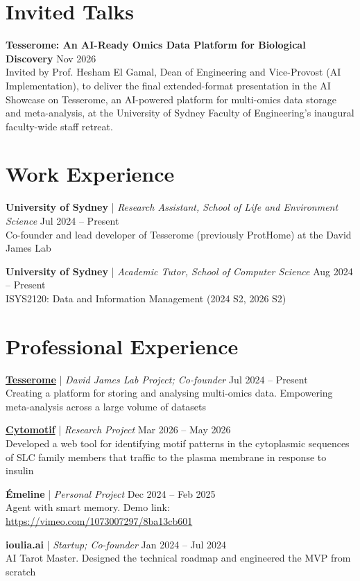 \documentclass[10pt, a4paper]{article}
\newcommand{\TalkEntry}[3]{
  {\raggedright
  \noindent \textbf{#1} \hfill #2 \\
  {\small #3} \par}
  \vspace{4pt}
}
\newcommand{\ExperienceEntry}[4]{
  \noindent \textbf{#1} | \textit{#3} \hfill #2 \\
  {\small #4} \par
  \vspace{4pt}
}
\begin{document}
\section{Invited Talks}
\TalkEntry{Tesserome: An AI-Ready Omics Data Platform for Biological Discovery}{Nov 2026}
{Invited by Prof. Hesham El Gamal, Dean of Engineering and Vice-Provost (AI Implementation), to deliver the final extended-format presentation in the AI Showcase on Tesserome, an AI-powered platform for multi-omics data storage and meta-analysis, at the University of Sydney Faculty of Engineering’s inaugural faculty-wide staff retreat.}

\section{Work Experience}
\ExperienceEntry{University of Sydney}{Jul 2024 -- Present}
{Research Assistant, School of Life and Environment Science}
{Co-founder and lead developer of Tesserome (previously ProtHome) at the David James Lab}

\ExperienceEntry{University of Sydney}{Aug 2024 -- Present}
{Academic Tutor, School of Computer Science}
{ISYS2120: Data and Information Management (2024 S2, 2026 S2)}

\section{Professional Experience}

\ExperienceEntry{\href{https://tesserome.com/}{Tesserome}}{Jul 2024 -- Present}
{David James Lab Project; Co-founder}
{Creating a platform for storing and analysing multi-omics data. Empowering meta-analysis across a large volume of datasets}

\ExperienceEntry{\href{https://cytomotif.streamlit.app/}{Cytomotif}}{Mar 2026 -- May 2026}
{Research Project}
{Developed a web tool for identifying motif patterns in the cytoplasmic sequences of SLC family members that traffic to the plasma membrane in response to insulin}

\ExperienceEntry{Émeline}{Dec 2024 -- Feb 2025}
{Personal Project}
{Agent with smart memory. Demo link: \href{https://vimeo.com/1073007297/8ba13cb601}{https://vimeo.com/1073007297/8ba13cb601}}

\ExperienceEntry{ioulia.ai}{Jan 2024 -- Jul 2024}
{Startup; Co-founder}
{AI Tarot Master. Designed the technical roadmap and engineered the MVP from scratch}
\end{document}
